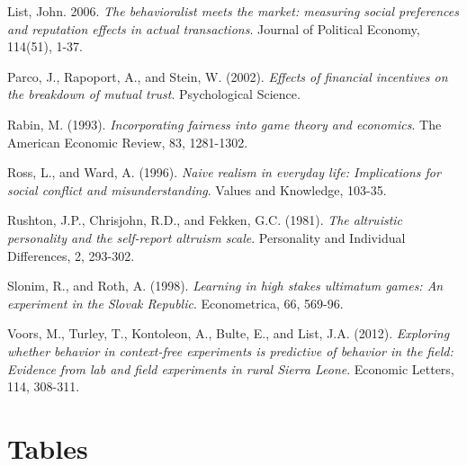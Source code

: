 \documentclass{article}
\begin{document}
\begin{thebibliography}{9}
List, John. 2006.
\textit{The behavioralist meets the market: measuring social preferences and reputation effects in actual transactions}.
Journal of Political Economy, 114(51), 1-37.


Parco, J., Rapoport, A., and Stein, W. (2002).
\textit{Effects of financial incentives on the breakdown of mutual trust}.
Psychological Science.

Rabin, M. (1993).
\textit{Incorporating fairness into game theory and economics}.
The American Economic Review, 83, 1281-1302.

Ross, L., and Ward, A. (1996).
\textit{Naive realism in everyday life: Implications for social conflict and misunderstanding}.
Values and Knowledge, 103-35.

Rushton, J.P., Chrisjohn, R.D., and Fekken, G.C. (1981).
\textit{The altruistic personality and the self-report altruism scale}.
Personality and Individual Differences, 2, 293-302.

Slonim, R., and Roth, A. (1998).
\textit{Learning in high stakes ultimatum games: An experiment in the Slovak Republic}.
Econometrica, 66, 569-96.


Voors, M., Turley, T., Kontoleon, A., Bulte, E., and List, J.A. (2012).
\textit{Exploring whether behavior in context-free experiments is predictive of behavior in the field: Evidence from lab and field experiments in rural Sierra Leone}.
Economic Letters, 114, 308-311.


\end{thebibliography}


\appendix
\section{Tables}
\end{document}
